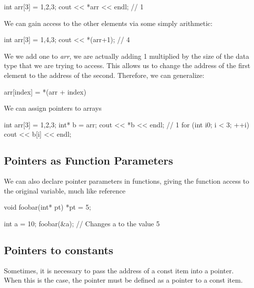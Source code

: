 \documentclass{report}
\begin{document}
    \begin{cppcode}
int arr[3] = {1,2,3};
cout << *arr << endl; // 1
    \end{cppcode}
    
    \bigbreak \noindent 
    We can gain access to the other elements via some simply arithmetic:
    \bigbreak \noindent 
    
    \begin{cppcode}
int arr[3] = {1,4,3};
cout << *(arr+1); // 4
    \end{cppcode}
    
    \bigbreak \noindent 
    We we add one to \textit{arr}, we are actually adding 1 multiplied by the size of the data type that we are trying to access. This allows us to change the address of the first element to the address of the second.
    \bigbreak \noindent 
    Therefore, we can generalize:
    \bigbreak \noindent 
    
    \begin{cppcode}
arr[index] = *(arr + index)
    \end{cppcode}
    

    \bigbreak \noindent 
    We can assign pointers to arrays
    \bigbreak \noindent 
    
    \begin{cppcode}
int arr[3] = {1,2,3};
int* b = arr;
cout << *b << endl; // 1
for (int i{0}; i < 3; ++i) {
    cout << b[i] << endl;
}
    \end{cppcode}
    

    \pagebreak
    \subsection{Pointers as Function Parameters}
    \bigbreak \noindent 
    We can also declare pointer parameters in functions, giving the function access to the original variable, much like reference
    \bigbreak \noindent 
    
    \begin{cppcode}
void foobar(int* pt) {
    *pt = 5;
}

int a = 10;
foobar(&a); // Changes a to the value 5

    \end{cppcode}
    

    \bigbreak \noindent 
    \subsection{Pointers to constants}
    \bigbreak \noindent 
    Sometimes, it is necessary to pass the address of a const item into a pointer. When this is the case, the pointer must be defined as a pointer to a const item.
    \bigbreak \noindent 
    
\end{document}
